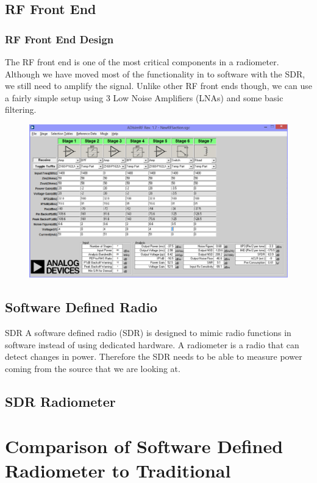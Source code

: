 \documentclass{beamer}
\begin{document}
\subsection{RF Front End}
\begin{frame}
\frametitle{RF Front End Design}

The RF front end is one of the most critical components in a radiometer.  Although we have moved most of the functionality in to software with the SDR, we still need to amplify the signal.  Unlike other RF front ends though, we can use a fairly simple setup using 3 Low Noise Amplifiers (LNAs) and some basic filtering.  


\begin{figure}\label{agronomy_roof}
\includegraphics[width=0.6\linewidth]{images/RF_Front_end.png}
\end{figure}
\end{frame}

\subsection{Software Defined Radio}
\begin{frame}
\begin{block}{SDR}
A software defined radio (SDR) is designed to mimic radio functions in software instead of using dedicated hardware.  A radiometer is a radio that can detect changes in power.  Therefore the SDR needs to be able to measure power coming from the source that we are looking at. 
\end{block}
\end{frame}
\subsection{SDR Radiometer}
\section{Comparison of Software Defined Radiometer to Traditional}
\end{document}
